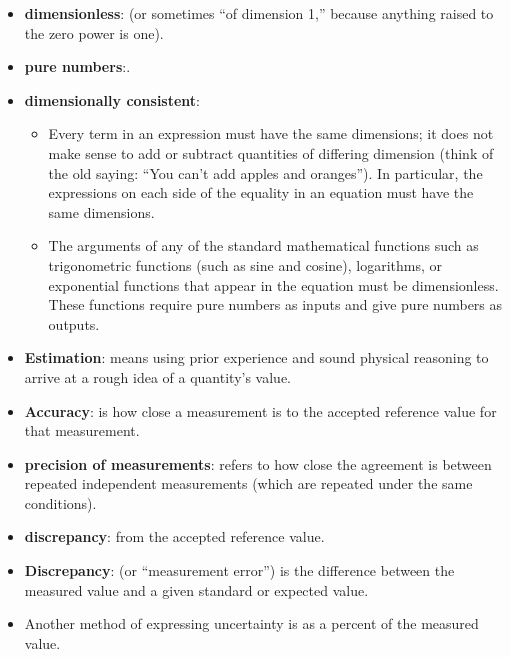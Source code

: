 \documentclass{report}
\begin{document}
\begin{itemize}
        \item \textbf{dimensionless}: (or sometimes “of dimension 1,” because anything raised to the zero power is one). 
        \item \textbf{pure numbers}:.
        \item \textbf{dimensionally consistent}:
            \begin{itemize}
                \item Every term in an expression must have the same dimensions; it does not make sense to add or subtract quantities of differing dimension (think of the old saying: “You can’t add apples and oranges”). In particular, the expressions on each side of the equality in an equation must have the same dimensions.
                \item The arguments of any of the standard mathematical functions such as trigonometric functions (such as sine and cosine), logarithms, or exponential functions that appear in the equation must be dimensionless. These functions require pure numbers as inputs and give pure numbers as outputs.
            \end{itemize}
        \item \textbf{Estimation}: means using prior experience and sound physical reasoning to arrive at a rough idea of a quantity’s value.
        \item \textbf{Accuracy}: is how close a measurement is to the accepted reference value for that measurement.
        \item \textbf{precision of measurements}: refers to how close the agreement is between repeated independent measurements (which are repeated under the same conditions).
        \item \textbf{discrepancy}: from the accepted reference value.
        \item \textbf{Discrepancy}: (or “measurement error”) is the difference between the measured value and a given standard or expected value.
        \item   Another method of expressing uncertainty is as a percent of the measured value. 
    \end{itemize}

    \pagebreak 
\end{document}
